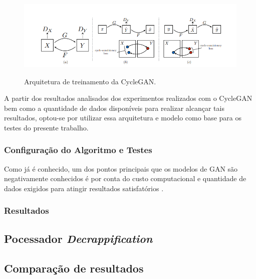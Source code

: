 \begin{figure}[H]
  \centering
  \caption{Arquitetura de treinamento da CycleGAN.}
  \includegraphics[scale=.57]{figuras/cycleconsistencyandlosses.png}
  \label{fig:cycleconsistencyandlosses}
\end{figure}

A partir dos resultados analisados dos experimentos realizados com o CycleGAN bem como a quantidade de dados disponíveis para realizar alcançar tais resultados, optou-se por utilizar essa arquitetura e modelo como base para os testes do presente trabalho.

\subsubsection{Configuração do Algoritmo e Testes}

Como já é conhecido, um dos pontos principais que os modelos de GAN são negativamente conhecidos é por conta do custo computacional e quantidade de dados exigidos para atingir resultados satisfatórios \cite{f8-decrappification}.

\subsubsection{Resultados}

\subsection{Pocessador \textit{Decrappification}}
\subsection{Comparação de resultados}